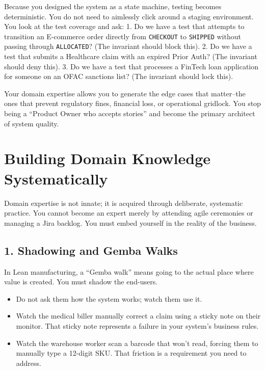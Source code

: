 \documentclass[
  11pt,
  openany,
  oneside]{book}
\providecommand{\tightlist}{%
  \setlength{\itemsep}{0pt}\setlength{\parskip}{0pt}}
\begin{document}
Because you designed the system as a state machine, testing becomes
deterministic. You do not need to aimlessly click around a staging
environment. You look at the test coverage and ask: 1. Do we have a test
that attempts to transition an E-commerce order directly from
\texttt{CHECKOUT} to \texttt{SHIPPED} without passing through
\texttt{ALLOCATED}? (The invariant should block this). 2. Do we have a
test that submits a Healthcare claim with an expired Prior Auth? (The
invariant should deny this). 3. Do we have a test that processes a
FinTech loan application for someone on an OFAC sanctions list? (The
invariant should lock this).

Your domain expertise allows you to generate the edge cases that
matter--the ones that prevent regulatory fines, financial loss, or
operational gridlock. You stop being a ``Product Owner who accepts
stories'' and become the primary architect of system quality.

\bigskip

\section{Building Domain Knowledge
Systematically}\label{building-domain-knowledge-systematically}

Domain expertise is not innate; it is acquired through deliberate,
systematic practice. You cannot become an expert merely by attending
agile ceremonies or managing a Jira backlog. You must embed yourself in
the reality of the business.

\subsection{1. Shadowing and Gemba
Walks}\label{shadowing-and-gemba-walks}

In Lean manufacturing, a ``Gemba walk'' means going to the actual place
where value is created. You must shadow the end-users.

\begin{itemize}
\tightlist
\item
  Do not ask them how the system works; watch them use it.
\item
  Watch the medical biller manually correct a claim using a sticky note
  on their monitor. That sticky note represents a failure in your
  system's business rules.
\item
  Watch the warehouse worker scan a barcode that won't read, forcing
  them to manually type a 12-digit SKU. That friction is a requirement
  you need to address.
\end{itemize}
\end{document}

